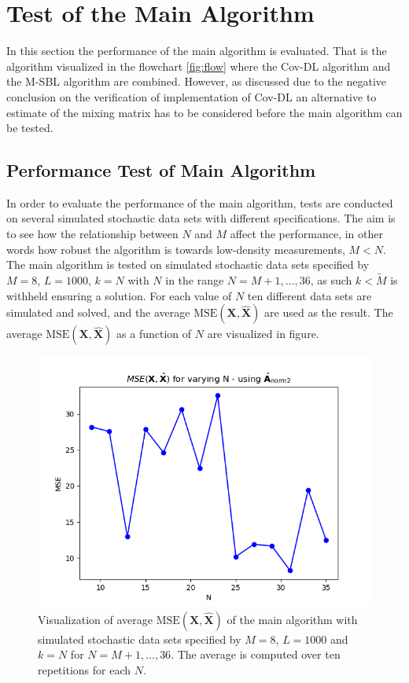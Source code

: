 \section{Test of the Main Algorithm}\label{sec:test_base}
In this section the performance of the main algorithm is evaluated. 
That is the algorithm visualized in the flowchart \ref{fig:flow} where the Cov-DL algorithm and the M-SBL algorithm are combined. 
However, as discussed due to the negative conclusion on the verification of implementation of Cov-DL an alternative to estimate of the mixing matrix has to be considered before the main algorithm can be tested.  
 
  

\subsection{Performance Test of Main Algorithm}\label{sec:Main_test}
In order to evaluate the performance of the main algorithm, tests are conducted on several simulated stochastic data sets with different specifications. 
The aim is to see how the relationship between $N$ and $M$ affect the performance, in other words how robust the algorithm is towards low-density measurements, $M < N$. 
The main algorithm is tested on simulated stochastic data sets specified by $M = 8$, $L = 1000$, $k = N$ with $N$ in the range $N = M+1, \dots, 36$, as such $k < \widetilde{M}$ is withheld ensuring a solution.
For each value of $N$ ten different data sets are simulated and solved, and the average $\text{MSE}(\mathbf{X}, \hat{\mathbf{X}})$ are used as the result. 
The average $\text{MSE}(\mathbf{X}, \hat{\mathbf{X}})$ as a function of $N$ are visualized in figure.
\begin{figure}[H]
    \centering
	\includegraphics[scale=0.5]{figures/ch_6/varyN1.png}
	\caption{Visualization of average $\text{MSE}(\mathbf{X}, \hat{\mathbf{X}})$ of the main algorithm with simulated stochastic data sets specified by $M = 8$, $L = 1000$ and $k = N$ for $N = M+1, \dots , 36$. The average is computed over ten repetitions for each $N$.}
	\label{fig:varyN1}
\end{figure}
